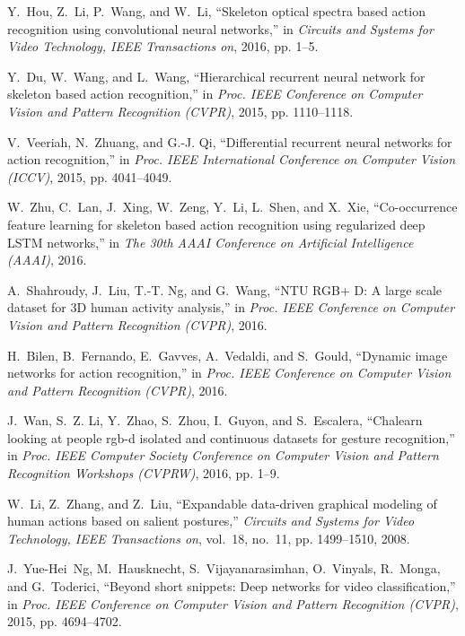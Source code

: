\documentclass[10pt, a4paper, conference]{IEEEtran}
\begin{document}
\begin{thebibliography}{10}
Y.~Hou, Z.~Li, P.~Wang, and W.~Li, ``Skeleton optical spectra based action
  recognition using convolutional neural networks,'' in \emph{Circuits and
  Systems for Video Technology, IEEE Transactions on}, 2016, pp. 1--5.

Y.~Du, W.~Wang, and L.~Wang, ``Hierarchical recurrent neural network for
  skeleton based action recognition,'' in \emph{Proc. IEEE Conference on
  Computer Vision and Pattern Recognition (CVPR)}, 2015, pp. 1110--1118.

V.~Veeriah, N.~Zhuang, and G.-J. Qi, ``Differential recurrent neural networks
  for action recognition,'' in \emph{Proc. IEEE International Conference on
  Computer Vision (ICCV)}, 2015, pp. 4041--4049.

W.~Zhu, C.~Lan, J.~Xing, W.~Zeng, Y.~Li, L.~Shen, and X.~Xie, ``Co-occurrence
  feature learning for skeleton based action recognition using regularized deep
  {LSTM} networks,'' in \emph{The 30th AAAI Conference on Artificial
  Intelligence (AAAI)}, 2016.

A.~Shahroudy, J.~Liu, T.-T. Ng, and G.~Wang, ``{NTU RGB+ D}: A large scale
  dataset for {3D} human activity analysis,'' in \emph{Proc. IEEE Conference on
  Computer Vision and Pattern Recognition (CVPR)}, 2016.

H.~Bilen, B.~Fernando, E.~Gavves, A.~Vedaldi, and S.~Gould, ``Dynamic image
  networks for action recognition,'' in \emph{Proc. IEEE Conference on Computer
  Vision and Pattern Recognition (CVPR)}, 2016.

J.~Wan, S.~Z. Li, Y.~Zhao, S.~Zhou, I.~Guyon, and S.~Escalera, ``Chalearn
  looking at people rgb-d isolated and continuous datasets for gesture
  recognition,'' in \emph{Proc. IEEE Computer Society Conference on Computer
  Vision and Pattern Recognition Workshops (CVPRW)}, 2016, pp. 1--9.

W.~Li, Z.~Zhang, and Z.~Liu, ``Expandable data-driven graphical modeling of
  human actions based on salient postures,'' \emph{Circuits and Systems for
  Video Technology, IEEE Transactions on}, vol.~18, no.~11, pp. 1499--1510,
  2008.

J.~Yue-Hei~Ng, M.~Hausknecht, S.~Vijayanarasimhan, O.~Vinyals, R.~Monga, and
  G.~Toderici, ``Beyond short snippets: Deep networks for video
  classification,'' in \emph{Proc. IEEE Conference on Computer Vision and
  Pattern Recognition (CVPR)}, 2015, pp. 4694--4702.


\end{thebibliography}
\end{document}
